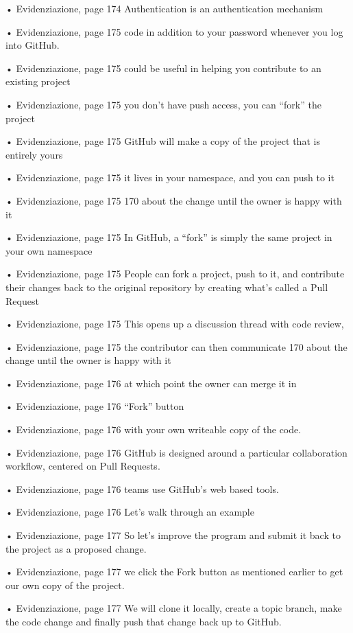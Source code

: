 • Evidenziazione, page 174
Authentication is an authentication mechanism

• Evidenziazione, page 175
code in addition to your password whenever you log into GitHub.

• Evidenziazione, page 175
could be useful in helping you contribute to an existing project

• Evidenziazione, page 175
you don’t have push access, you can “fork” the project

• Evidenziazione, page 175
GitHub will make a copy of the project that is entirely yours

• Evidenziazione, page 175
it lives in your namespace, and you can push to it

• Evidenziazione, page 175
170 about the change until the owner is happy with it

• Evidenziazione, page 175
In GitHub, a “fork” is simply the same project in your own namespace

• Evidenziazione, page 175
People can fork a project, push to it, and contribute their changes back to the original repository by creating what’s called a Pull Request

• Evidenziazione, page 175
This opens up a discussion thread with code review,

• Evidenziazione, page 175
the contributor can then communicate 170 about the change until the owner is happy with it

• Evidenziazione, page 176
at which point the owner can merge it in

• Evidenziazione, page 176
“Fork” button

• Evidenziazione, page 176
with your own writeable copy of the code.

• Evidenziazione, page 176
GitHub is designed around a particular collaboration workflow, centered on Pull Requests.

• Evidenziazione, page 176
teams use GitHub’s web based tools.

• Evidenziazione, page 176
Let’s walk through an example

• Evidenziazione, page 177
So let’s improve the program and submit it back to the project as a proposed change.

• Evidenziazione, page 177
we click the Fork button as mentioned earlier to get our own copy of the project.

• Evidenziazione, page 177
We will clone it locally, create a topic branch, make the code change and finally push that change back up to GitHub.

